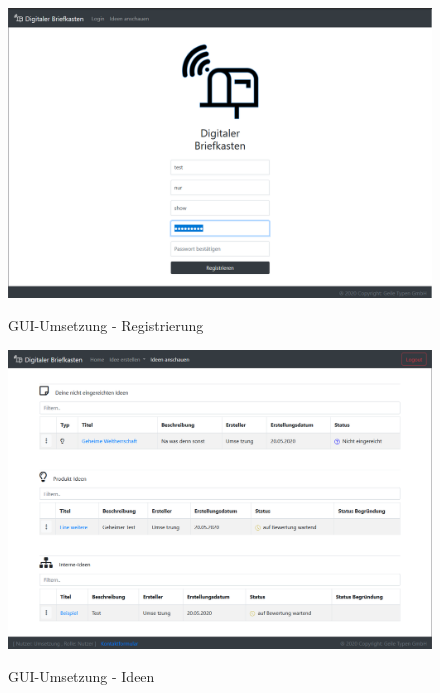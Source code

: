 \begin{figure}[h]
    \centering
    \begin{minipage}[t]{1\textwidth}
        \caption{GUI-Umsetzung - Registrierung }
        \includegraphics[width=1\textwidth]{img/registrierung-umsetzung.png}\\
    \end{minipage}
\end{figure}

\begin{figure}[h]
    \centering
    \begin{minipage}[t]{1\textwidth}
        \caption{GUI-Umsetzung - Ideen}
        \includegraphics[width=1\textwidth]{img/ideen-umsetzung.png}\\
    \end{minipage}
\end{figure}

